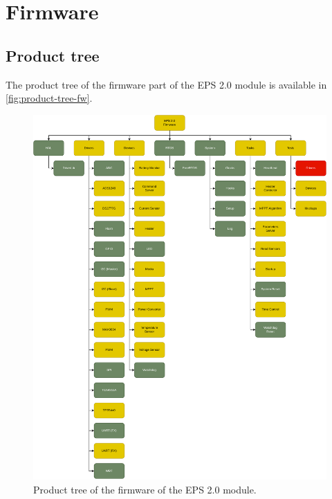 %
%
%
%
%

%
%
%
%
%

\chapter{Firmware} \label{ch:firmware}

\section{Product tree}

The product tree of the firmware part of the EPS 2.0 module is available in \autoref{fig:product-tree-fw}.

\begin{figure}[!ht]
    \begin{center}
        \includegraphics[width=\textwidth]{figures/product-tree-fw.pdf}
        \caption{Product tree of the firmware of the EPS 2.0 module.}
        \label{fig:product-tree-fw}
    \end{center}
\end{figure}

